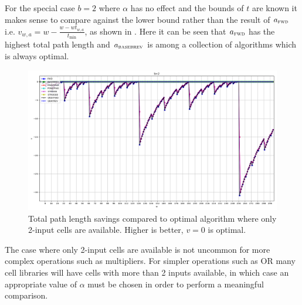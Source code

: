 \documentclass[11pt,twoside]{article}
\begin{document}
For the special case $b=2$ where $\alpha$ has no effect and the bounds of $t$
are known it makes sense to compare against the lower bound rather than the
result of $a_{\textsc{fwd}}$
i.e. $v_{w,a} = w - \frac{w-wt_{w,a}}{t_{\text{min}}}$,
as shown in .
Here it can be seen that $a_{\textsc{fwd}}$ has the highest total path length
and $a_{\textsc{basebrev}}$ is among a collection of algorithms which is always
optimal.
\begin{figure}[h]
    \centering
    \includegraphics[width=1.0\textwidth]{b=2.png}
    \caption{Total path length savings compared to optimal algorithm where only
             2-input cells are available.
             Higher is better, $v=0$ is optimal.
             \label{fig:b=2}}
\end{figure}

The case where only 2-input cells are available is not uncommon for more complex
operations such as multipliers.
For simpler operations such as OR many cell libraries will have cells with more
than 2 inputs available, in which case an appropriate value of $\alpha$ must be
chosen in order to perform a meaningful comparison.





\ifdefined\ShowBibliography
\clearpage

{} %
\fi

\ifdefined\ShowAppendix \clearpage \begin{appendices} %
    \addappheadtotoc


%
%

\end{appendices} \fi %

\end{document}
